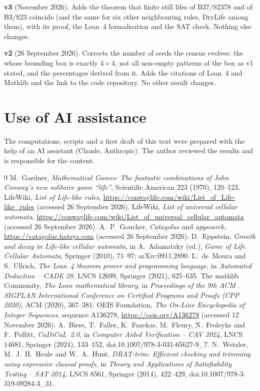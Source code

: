 \documentclass[11pt,a4paper]{article}
\begin{document}
\textbf{v3} (November 2026). Adds the theorem that finite still lifes of B37/S2378 and
of B3/S23 coincide (and the same for six other neighbouring rules, DryLife among them),
with its proof, the Lean~4 formalisation and the SAT check. Nothing else changes.

\textbf{v2} (26 September 2026). Corrects the number of seeds the census evolves: the
\evaluadasCasaSemillas{} whose bounding box is exactly $4\times4$, not all
\semillasCasa{} non-empty patterns of the box as v1 stated, and the percentages derived
from it. Adds the citations of Lean~4 and Mathlib and the link to the code repository.
No other result changes.

\section*{Use of AI assistance}

The computations, scripts and a first draft of this text were prepared with the help
of an AI assistant (Claude, Anthropic). The author reviewed the results and is
responsible for the content.

\begin{thebibliography}{9}
M.~Gardner, \emph{Mathematical Games: The fantastic combinations of John Conway's new
solitaire game ``life''}, Scientific American 223 (1970), 120--123.
LifeWiki, \emph{List of Life-like rules},
\url{https://conwaylife.com/wiki/List_of_Life-like_rules} (accessed 26 September 2026).
LifeWiki, \emph{List of universal cellular automata},
\url{https://conwaylife.com/wiki/List_of_universal_cellular_automata} (accessed
26 September 2026).
A.~P.~Goucher, \emph{Catagolue} and \emph{apgsearch},
\url{https://catagolue.hatsya.com} (accessed 26 September 2026).
D.~Eppstein, \emph{Growth and decay in Life-like cellular automata}, in A.~Adamatzky
(ed.), \emph{Game of Life Cellular Automata}, Springer (2010), 71--97;
arXiv:0911.2890.
L.~de~Moura and S.~Ullrich, \emph{The Lean~4 theorem prover and programming language},
in \emph{Automated Deduction -- CADE 28}, LNCS 12699, Springer (2021), 625--635.
The mathlib Community, \emph{The Lean mathematical library}, in \emph{Proceedings of
the 9th ACM SIGPLAN International Conference on Certified Programs and Proofs (CPP
2020)}, ACM (2020), 367--381.
OEIS Foundation, \emph{The On-Line Encyclopedia of Integer Sequences}, sequence A136278,
\url{https://oeis.org/A136278} (accessed 12 November 2026).
A.~Biere, T.~Faller, K.~Fazekas, M.~Fleury, N.~Froleyks and F.~Pollitt, \emph{CaDiCaL~2.0},
in \emph{Computer Aided Verification -- CAV 2024}, LNCS 14681, Springer (2024), 133--152,
doi:10.1007/978-3-031-65627-9\_7.
N.~Wetzler, M.~J.~H.~Heule and W.~A.~Hunt, \emph{DRAT-trim: Efficient checking and trimming
using expressive clausal proofs}, in \emph{Theory and Applications of Satisfiability Testing
-- SAT 2014}, LNCS 8561, Springer (2014), 422--429, doi:10.1007/978-3-319-09284-3\_31.
\end{thebibliography}
\end{document}
